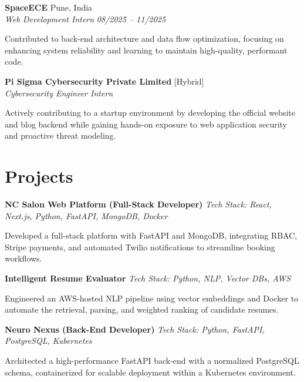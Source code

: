 \documentclass[letterpaper]{article}
\begin{document}
\textbf{SpaceECE} \hfill Pune, India \\
\textit{Web Development Intern} \hfill \textit{08/2025 -- 11/2025}
\begin{highlights}
    \item Contributed to back-end architecture and data flow optimization, focusing on enhancing system reliability and learning to maintain high-quality, performant code.
\end{highlights}


\textbf{Pi Sigma Cybersecurity Private Limited} \hfill [Hybrid] \\
\textit{Cybersecurity Engineer Intern} \hfill 
\begin{highlights}
\item Actively contributing to a startup environment by developing the official website and blog backend while gaining hands-on exposure to web application security and proactive threat modeling.
\end{highlights}

\section{Projects}
\textbf{NC Salon Web Platform (Full-Stack Developer)} \hfill \textit{Tech Stack: React, Next.js, Python, FastAPI, MongoDB, Docker}
\begin{highlights}
    \item Developed a full-stack platform with FastAPI and MongoDB, integrating RBAC, Stripe payments, and automated Twilio notifications to streamline booking workflows.
\end{highlights}

\textbf{Intelligent Resume Evaluator} \hfill \textit{Tech Stack: Python, NLP, Vector DBs, AWS}
\begin{highlights}
    \item Engineered an AWS-hosted NLP pipeline using vector embeddings and Docker to automate the retrieval, parsing, and weighted ranking of candidate resumes.
\end{highlights}

\textbf{Neuro Nexus (Back-End Developer)} \hfill \textit{Tech Stack: Python, FastAPI, PostgreSQL, Kubernetes}
\begin{highlights}
    \item Architected a high-performance FastAPI back-end with a normalized PostgreSQL schema, containerized for scalable deployment within a Kubernetes environment.
\end{highlights}
\end{document}
